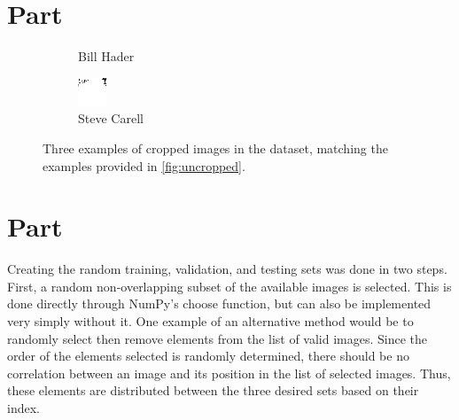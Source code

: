 \documentclass{article}
\newcommand{\enterproblemHeader}[1]{
}
\newcommand{\exitproblemHeader}[1]{
}
\newcounter{problem} %
\newcommand{\problemName}{}
\newenvironment{problem}[1][Part \theproblem]{ %
	\stepcounter{problem} %
	\renewcommand{\problemName}{#1} %
	\section{\problemName} %
	\enterproblemHeader{\problemName} %
}{
	\exitproblemHeader{\problemName} %
}
\begin{document}
\begin{problem}
\begin{figure}
\begin{subfigure}{0.33\linewidth}
			\caption{Bill Hader}
		\end{subfigure}
		\begin{subfigure}{0.33\linewidth}
			\includegraphics[width=\linewidth]{c_carell36}
			\caption{Steve Carell}
		\end{subfigure}
		\caption{Three examples of cropped images in the dataset, matching the examples provided in \cref{fig:uncropped}.}
		\label{fig:cropped}
	\end{figure}
\end{problem}
\clearpage


\begin{problem}
	Creating the random training, validation, and testing sets was done in two steps. First, a random non-overlapping subset of the available images is selected. This is done directly through NumPy's choose function, but can also be implemented very simply without it. One example of an alternative method would be to randomly select then remove elements from the list of valid images. Since the order of the elements selected is randomly determined, there should be no correlation between an image and its position in the list of selected images. Thus, these elements are distributed between the three desired sets based on their index.
\end{problem}
\clearpage
\end{document}
